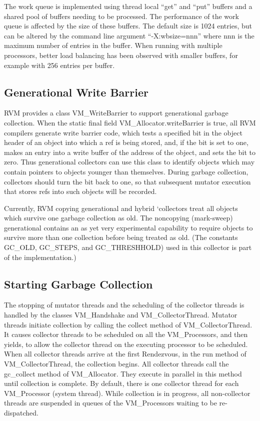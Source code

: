 The work queue is implemented using thread local ``get'' and ``put'' buffers
and a shared pool of buffers needing to be processed.  The performance of the
work queue is affected by the size of these buffers.  The default size is 1024 
entries, but can be altered by the command line argument ``-X:wbsize=nnn'' where
nnn is the maximum number of entries in the buffer.  When running with multiple
processors, better load balancing has been observed with smaller buffers, for
example with 256 entries per buffer.  

\subsection{Generational Write Barrier} \label{sssec:writebarrier}
RVM provides a class VM\_WriteBarrier to support generational garbage 
collection. When the static final field VM\_Allocator.writeBarrier is true,
all RVM compilers generate write barrier code, which tests a specified
bit in the object header of an object into which a ref is being stored,
and, if the bit is set to one, makes an entry into a write buffer of the 
address of the object, and sets the bit to zero.  Thus generational 
collectors can use this class to 
identify objects which may contain pointers to objects 
younger than themselves.  During garbage collection, collectors should
turn the bit back to one, so that subsequent mutator execution that stores
refs into such objects will be recorded.

Currently, RVM copying generational and hybrid 
`collectors treat all objects which
survive one garbage collection as old.  The noncopying (mark-sweep) 
generational contains an as yet very experimental capability to require
objects to survive more than one collection before being treated as old.
(The constants GC\_OLD, GC\_STEPS, and GC\_THRESHHOLD) used in this 
collector is part of the implementation.)


\subsection{Starting Garbage Collection} \label{sssec:startgc}
The stopping of mutator threads and the scheduling of the collector
threads is handled by the classes VM\_Handshake and VM\_CollectorThread.
Mutator threads initiate collection by calling the collect method
of VM\_CollectorThread.  It causes collector threads to be scheduled
on all the VM\_Processors, and then yields, to allow the collector thread
on the executing processor to be scheduled. When all collector threads
arrive at the first Rendezvous, in the run method of VM\_CollectorThread,
the collection begins.
All collector threads 
call the gc\_collect method of VM\_Allocator.  They execute
in parallel in this method until collection is complete.  By default,
there is one collector thread for each VM\_Processor (system thread).
While collection is in progress, all non-collector threads are suspended
in queues of the VM\_Processors waiting to be re-dispatched.

